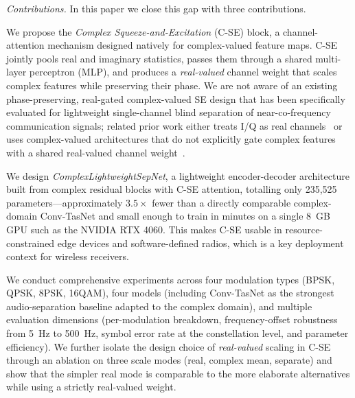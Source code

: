 \documentclass[twocolumn,english]{svjour3}
\begin{document}
\emph{Contributions.} In this paper we close this gap with three contributions.
\begin{compactenum}
\begin{sloppypar}
\item We propose the \emph{Complex Squeeze-and-Excitation} (C-SE) block, a channel-attention mechanism designed natively for complex-valued feature maps. C-SE jointly pools real and imaginary statistics, passes them through a shared multi-layer perceptron (MLP), and produces a \emph{real-valued} channel weight that scales complex features while preserving their phase. We are not aware of an existing phase-preserving, real-gated complex-valued SE design that has been specifically evaluated for lightweight single-channel blind separation of near-co-frequency communication signals; related prior work either treats I/Q as real channels~\cite{chen2019deep} or uses complex-valued architectures that do not explicitly gate complex features with a shared real-valued channel weight~\cite{trabelsi2018deep}.
\end{sloppypar}
\begin{sloppypar}
\item We design \emph{ComplexLightweightSepNet}, a lightweight encoder-decoder architecture built from complex residual blocks with C-SE attention, totalling only 235{,}525 parameters---approximately $3.5\times$ fewer than a directly comparable complex-domain Conv-TasNet and small enough to train in minutes on a single \SI{8}{GB} GPU such as the NVIDIA RTX 4060. This makes C-SE usable in resource-constrained edge devices and software-defined radios, which is a key deployment context for wireless receivers.
\end{sloppypar}
\begin{sloppypar}
\item We conduct comprehensive experiments across four modulation types (BPSK, QPSK, 8PSK, 16QAM), four models (including Conv-TasNet as the strongest audio-separation baseline adapted to the complex domain), and multiple evaluation dimensions (per-modulation breakdown, frequency-offset robustness from \SI{5}{Hz} to \SI{500}{Hz}, symbol error rate at the constellation level, and parameter efficiency). We further isolate the design choice of \emph{real-valued} scaling in C-SE through an ablation on three scale modes (real, complex mean, separate) and show that the simpler real mode is comparable to the more elaborate alternatives while using a strictly real-valued weight.
\end{sloppypar}
\end{compactenum}
\end{document}
